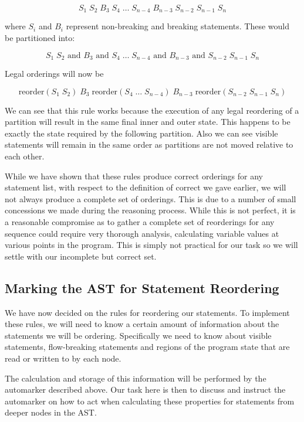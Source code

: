 \documentclass{report}
\begin{document}
$$S_1 \; S_2 \; B_3 \; S_4 \; \ldots \; S_{n-4} \; B_{n-3} \; S_{n-2} \; S_{n-1} \; S_n$$

where $S_i$ and $B_i$ represent non-breaking and breaking statements. These would be partitioned into:

$$S_1 \; S_2 \text{ and } B_3 \text{ and } S_4 \; \ldots \; S_{n-4} \text{ and } B_{n-3} \text{ and } S_{n-2} \; S_{n-1} \; S_n$$

Legal orderings will now be

$$\text{reorder}(S_1 \; S_2) \; B_3 \; \text{reorder}(S_4 \; \ldots \; S_{n-4}) \; B_{n-3} \; \text{reorder}(S_{n-2} \; S_{n-1} \; S_n)$$

We can see that this rule works because the execution of any legal reordering of a partition will result in the same final inner and outer state.
This happens to be exactly the state required by the following partition. Also we can see visible statements will remain in the same order as
partitions are not moved relative to each other.

While we have shown that these rules produce correct orderings for any statement list, with respect to the definition of correct we gave earlier,
we will not always produce a complete set of orderings. This is due to a number of small concessions we made during the reasoning process. While
this is not perfect, it is a reasonable compromise as to gather a complete set of reorderings for any sequence could require very thorough analysis,
calculating variable values at various points in the program. This is simply not practical for our task so we will settle with our incomplete but
correct set.

\subsection{Marking the AST for Statement Reordering}

We have now decided on the rules for reordering our statements. To implement these rules, we will need to know a certain amount of information about
the statements we will be ordering. Specifically we need to know about visible statements, flow-breaking statements and regions of the program
state that are read or written to by each node.

The calculation and storage of this information will be performed by the automarker described above. Our task here is then to discuss and instruct
the automarker on how to act when calculating these properties for statements from deeper nodes in the AST.
\end{document}
